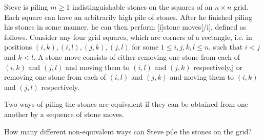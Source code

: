 Steve is piling $m\geq 1$ indistinguishable stones on the squares of an $n\times n$ grid.  Each square can have an arbitrarily high pile of stones.  After he finished piling his stones in some manner, he can then perform [i]stone moves[/i], defined as follows.  Consider any four grid squares, which are corners of a rectangle, i.e. in positions $(i, k), (i, l), (j, k), (j, l)$ for some $1\leq i, j, k, l\leq n$, such that $i<j$ and $k<l$.  A stone move consists of either removing one stone from each of $(i, k)$ and $(j, l)$ and moving them to $(i, l)$ and $(j, k)$ respectively,j or removing one stone from each of $(i, l)$ and $(j, k)$ and moving them to $(i, k)$ and $(j, l)$ respectively.

Two ways of piling the stones are equivalent if they can be obtained from one another by a sequence of stone moves.

How many different non-equivalent ways can Steve pile the stones on the grid?